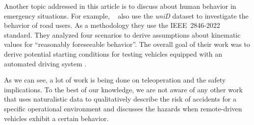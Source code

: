 Another topic addressed in this article is to discuss about human behavior in emergency situations. 
For example, \citeauthor{Certad2023}~\cite{Certad2023} also use the \emph{uniD} dataset to investigate the behavior of road users. 
As a methodology they use the \mbox{IEEE 2846-2022~\cite{IEEE2846-2022}} standard. 
They analyzed four scenarios to derive assumptions about kinematic values for ``reasonably foreseeable behavior''. 
The overall goal of their work was to derive potential starting conditions for testing vehicles equipped with an automated driving system \cite{Certad2023}.

As we can see, a lot of work is being done on teleoperation and the safety implications.
To the best of our knowledge, we are not aware of any other work that uses naturalistic data to qualitatively describe the risk of accidents for a specific operational environment and discusses the hazards when remote-driven vehicles exhibit a certain behavior.



